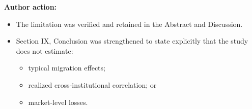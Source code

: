 \documentclass[11pt]{article}
\begin{document}
\textbf{Author action:}

\begin{itemize}

\item The limitation was verified and retained in the Abstract and Discussion.

\item Section IX, Conclusion was strengthened to state explicitly that the study does not estimate:

\begin{itemize}

\item typical migration effects;

\item realized cross-institutional correlation; or

\item market-level losses.

\end{itemize}

\end{itemize}
\end{document}
